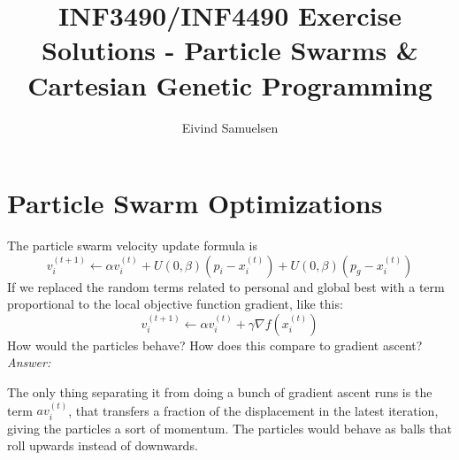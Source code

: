 
\title{\vspace{-2cm}INF3490/INF4490 Exercise Solutions - Particle Swarms \& Cartesian Genetic Programming}
\author{Eivind Samuelsen}
\date{}

\setlength\parindent{0pt}


    \renewcommand\marginsymbol[1][0pt]{%
  \tabto*{0cm}\makebox[-1cm][c]{$\mathbb{P}$}\tabto*{\TabPrevPos}}

\maketitle


\section{Particle Swarm Optimizations}
The particle swarm velocity update formula is
\begin{equation}
    v_i^{(t+1)} \leftarrow \alpha v_i ^{(t)} + U(0,\beta)(p_i-x_i^{(t)}) + U(0,\beta)(p_g - x_i^{(t)})
\end{equation}
If we replaced the random terms related to personal and global best with a term proportional to the local objective function gradient, like this:
\begin{equation}
    v_i^{(t+1)} \leftarrow \alpha v_i ^{(t)} + \gamma \nabla f(x_i^{(t)})
\end{equation}
How would the particles behave? How does this compare to gradient ascent?\\

\textit{Answer:}

The only thing separating it from doing a bunch of gradient ascent runs is the term \(av_i^{(t)}\), that transfers a fraction of the displacement in the latest iteration, giving the particles a sort of momentum.
The particles would behave as balls that roll upwards instead of downwards.

